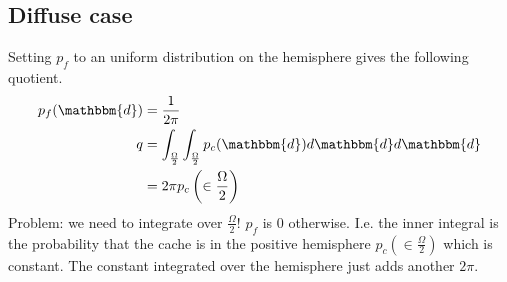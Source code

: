 \documentclass[]{article}
\begin{document}
\subsection{Diffuse case}

Setting $p_f$ to an uniform distribution on the hemisphere gives the following quotient.
\begin{align}
p_f(\mathbbm{d}) &= \frac{1}{2\pi}\\
q &= \int_\frac{\Omega}{2}\int_\frac{\Omega}{2} p_c(\mathbbm{d}) d\mathbbm{d} d\mathbbm{d}\\
&= 2\pi p_c\left(\in\frac{\Omega}{2}\right)
\end{align}
Problem: we need to integrate over $\frac{\Omega}{2}$! $p_f$ is 0 otherwise.
I.e. the inner integral is the probability that the cache is in the positive hemisphere $p_c(\in\frac{\Omega}{2})$ which is constant.
The constant integrated over the hemisphere just adds another $2\pi$.
\end{document}
